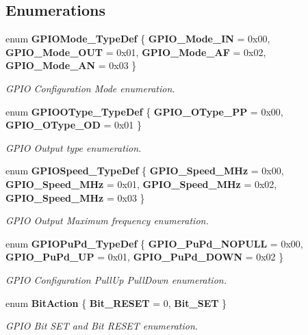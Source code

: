 \subsection*{Enumerations}
\begin{DoxyCompactItemize}
\item 
enum \textbf{ G\+P\+I\+O\+Mode\+\_\+\+Type\+Def} \{ \textbf{ G\+P\+I\+O\+\_\+\+Mode\+\_\+\+IN} = 0x00, 
\textbf{ G\+P\+I\+O\+\_\+\+Mode\+\_\+\+O\+UT} = 0x01, 
\textbf{ G\+P\+I\+O\+\_\+\+Mode\+\_\+\+AF} = 0x02, 
\textbf{ G\+P\+I\+O\+\_\+\+Mode\+\_\+\+AN} = 0x03
 \}\begin{DoxyCompactList}\small\item\em G\+P\+IO Configuration Mode enumeration. \end{DoxyCompactList}
\item 
enum \textbf{ G\+P\+I\+O\+O\+Type\+\_\+\+Type\+Def} \{ \textbf{ G\+P\+I\+O\+\_\+\+O\+Type\+\_\+\+PP} = 0x00, 
\textbf{ G\+P\+I\+O\+\_\+\+O\+Type\+\_\+\+OD} = 0x01
 \}\begin{DoxyCompactList}\small\item\em G\+P\+IO Output type enumeration. \end{DoxyCompactList}
\item 
enum \textbf{ G\+P\+I\+O\+Speed\+\_\+\+Type\+Def} \{ \textbf{ G\+P\+I\+O\+\_\+\+Speed\+\_\+M\+Hz} = 0x00, 
\textbf{ G\+P\+I\+O\+\_\+\+Speed\+\_\+M\+Hz} = 0x01, 
\textbf{ G\+P\+I\+O\+\_\+\+Speed\+\_\+M\+Hz} = 0x02, 
\textbf{ G\+P\+I\+O\+\_\+\+Speed\+\_\+M\+Hz} = 0x03
 \}\begin{DoxyCompactList}\small\item\em G\+P\+IO Output Maximum frequency enumeration. \end{DoxyCompactList}
\item 
enum \textbf{ G\+P\+I\+O\+Pu\+Pd\+\_\+\+Type\+Def} \{ \textbf{ G\+P\+I\+O\+\_\+\+Pu\+Pd\+\_\+\+N\+O\+P\+U\+LL} = 0x00, 
\textbf{ G\+P\+I\+O\+\_\+\+Pu\+Pd\+\_\+\+UP} = 0x01, 
\textbf{ G\+P\+I\+O\+\_\+\+Pu\+Pd\+\_\+\+D\+O\+WN} = 0x02
 \}\begin{DoxyCompactList}\small\item\em G\+P\+IO Configuration Pull\+Up Pull\+Down enumeration. \end{DoxyCompactList}
\item 
enum \textbf{ Bit\+Action} \{ \textbf{ Bit\+\_\+\+R\+E\+S\+ET} = 0, 
\textbf{ Bit\+\_\+\+S\+ET}
 \}\begin{DoxyCompactList}\small\item\em G\+P\+IO Bit S\+ET and Bit R\+E\+S\+ET enumeration. \end{DoxyCompactList}
\end{DoxyCompactItemize}
